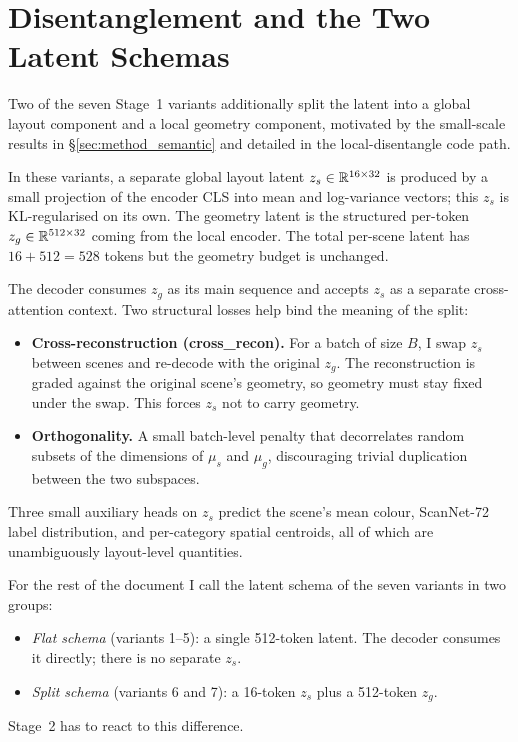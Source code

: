 \section{Disentanglement and the Two Latent Schemas}
\label{sec:method_disentangle}

Two of the seven Stage~1 variants additionally split the latent into a global layout component and a local geometry component, motivated by the small-scale results in \S\ref{sec:method_semantic} and detailed in the local-disentangle code path.

In these variants, a separate global layout latent $z_s \in \mathbb{R}^{16 \times 32}$ is produced by a small projection of the encoder CLS into mean and log-variance vectors; this $z_s$ is KL-regularised on its own. The geometry latent is the structured per-token $z_g \in \mathbb{R}^{512 \times 32}$ coming from the local encoder. The total per-scene latent has $16 + 512 = 528$ tokens but the geometry budget is unchanged.

The decoder consumes $z_g$ as its main sequence and accepts $z_s$ as a separate cross-attention context. Two structural losses help bind the meaning of the split:
\begin{itemize}
\item \textbf{Cross-reconstruction (cross\_recon).} For a batch of size $B$, I swap $z_s$ between scenes and re-decode with the original $z_g$. The reconstruction is graded against the original scene's geometry, so geometry must stay fixed under the swap. This forces $z_s$ not to carry geometry.
\item \textbf{Orthogonality.} A small batch-level penalty that decorrelates random subsets of the dimensions of $\mu_s$ and $\mu_g$, discouraging trivial duplication between the two subspaces.
\end{itemize}
Three small auxiliary heads on $z_s$ predict the scene's mean colour, ScanNet-72 label distribution, and per-category spatial centroids, all of which are unambiguously layout-level quantities.

For the rest of the document I call the latent schema of the seven variants in two groups:
\begin{itemize}
\item \emph{Flat schema} (variants 1--5): a single 512-token latent. The decoder consumes it directly; there is no separate $z_s$.
\item \emph{Split schema} (variants 6 and 7): a 16-token $z_s$ plus a 512-token $z_g$.
\end{itemize}
Stage~2 has to react to this difference.

